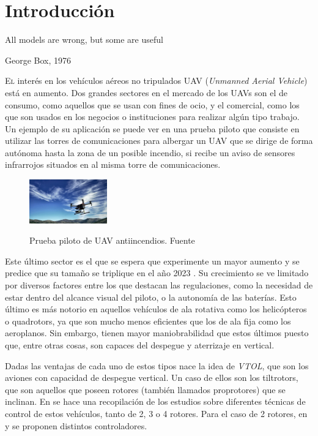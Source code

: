 \chapter{Introducción}\label{chp-01}
\epigraph{All models are wrong, but some are useful}{George Box, 1976}

\lettrine[lraise=-0.1, lines=2, loversize=0.2]{E}{l} interés en los vehículos aéreos no tripulados UAV (\textit{Unmanned Aerial Vehicle}) está en aumento. Dos grandes sectores en el mercado de los UAVs son el de consumo, como aquellos que se usan con fines de ocio, y el comercial, como los que son usados en los negocios o instituciones para realizar algún tipo trabajo. 
Un ejemplo de su aplicación se puede ver en una prueba piloto \cite{telefonica} que consiste en utilizar las torres de comunicaciones para albergar un UAV que se dirige de forma autónoma hasta la zona de un posible incendio, si recibe un aviso de sensores infrarrojos situados en al misma torre de comunicaciones.
\begin{figure}
   \includegraphics[width=0.3\textwidth]{introduccion/drone-incendio.jpg}\ 
   \caption{Prueba piloto de UAV antiincendios. Fuente \cite{telefonica} }
   \label{fig:telefonica}
\end{figure}

Este último sector es el que se  espera que experimente un mayor aumento y se predice que su tamaño se triplique en el año 2023 \cite{mercado-drones}.
Su crecimiento se ve limitado por diversos factores entre los que destacan las regulaciones, como la necesidad de estar dentro del alcance visual del piloto, o la autonomía de las baterías. Esto último es más notorio en aquellos vehículos de ala rotativa como los helicópteros o quadrotors, ya que son mucho menos eficientes que los de ala fija como los aeroplanos. Sin embargo, tienen mayor maniobrabilidad que estos últimos puesto que, entre otras cosas, son capaces del despegue y aterrizaje en vertical. 

Dadas las ventajas de cada uno de estos tipos nace la idea de \textit{VTOL}, que son los aviones con capacidad de despegue vertical. Un caso de ellos son los tiltrotors, que son aquellos que poseen rotores (también llamados proprotores) que se inclinan. 
En \cite{tiltrotor-review} se hace una recopilación de los estudios sobre diferentes técnicas de control de estos vehículos, tanto de 2, 3 o 4 rotores. Para el caso de 2 rotores, en \cite{tiltrotor-control} y  \cite{tiltrotor-control2} se proponen distintos controladores.  


